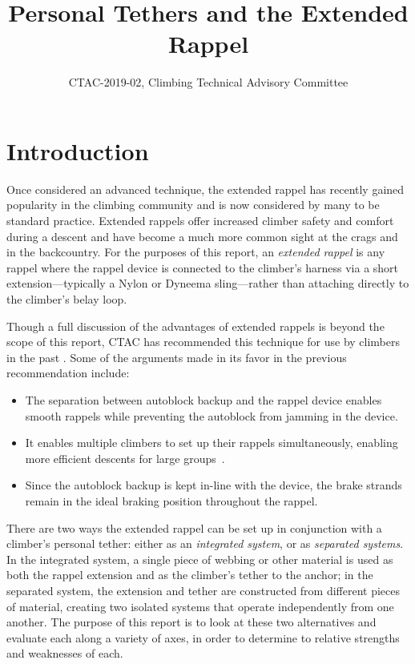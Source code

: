 \documentclass[nonacm,acmtog]{acmart}
\title{Personal Tethers and the Extended Rappel}
\subtitle{CTAC-2019-02, Climbing Technical Advisory Committee}
\begin{document}
\maketitle


\section{Introduction}
\label{sec:intro}

   Once considered an advanced technique, the extended rappel has recently
   gained popularity in the climbing community and is now considered by many to
   be standard practice.  Extended rappels offer increased climber safety and
   comfort during a descent and have become a much more common sight at the
   crags and in the backcountry.  For the purposes of this report, an {\it
   extended rappel} is any rappel where the rappel device is connected to the
   climber's harness via a short extension---typically a Nylon or Dyneema
   sling---rather than attaching directly to the climber's belay loop.

   Though a full discussion of the advantages of extended rappels is beyond the
   scope of this report, CTAC has recommended this technique for use by
   climbers in the past \cite{mtnrs-rappel-blog1}.  Some of the arguments made
   in its favor in the previous recommendation include:

   \begin{itemize}
      \item The separation between autoblock backup and the rappel device
      enables smooth rappels while preventing the autoblock from jamming in the
      device.

      \item It enables multiple climbers to set up their rappels
      simultaneously, enabling more efficient descents for large
      groups~\cite{ctac:2019-3}.

      \item Since the autoblock backup is kept in-line with the device, the
      brake strands remain in the ideal braking position throughout the rappel.
   \end{itemize}

   There are two ways the extended rappel can be set up in conjunction with
   a climber's personal tether: either as an {\it integrated system}, or as
   {\it separated systems}.  In the integrated system, a single piece of
   webbing or other material is used as both the rappel extension and as the
   climber's tether to the anchor; in the separated system, the extension and
   tether are constructed from different pieces of material, creating two
   isolated systems that operate independently from one another.  The purpose
   of this report is to look at these two alternatives and evaluate each along
   a variety of axes, in order to determine to relative strengths and
   weaknesses of each.
\end{document}
